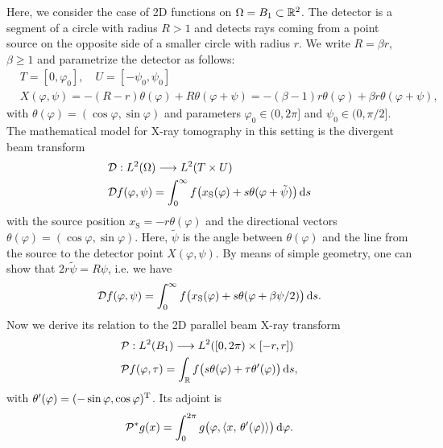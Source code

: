 \documentclass{amsart}
\renewcommand*{\phi}{\varphi}
\begin{document}
\begin{example}
 Here, we consider the case of 2D functions on $\Omega = B_1 \subset {\ensuremath{\mathbb{R}}}^2$. The detector is a segment of a circle with radius $R > 1$ and 
 detects rays coming from a point source on the opposite side of a smaller circle with radius $r$. We write $R = \beta r$, $\beta \geq 1$ 
 and parametrize the detector as follows:
 \begin{align*}
  & T = [0, \phi_0],\quad U = [-\psi_0, \psi_0] \\
  & X(\phi, \psi) = -(R - r) \theta(\phi) + R \theta(\phi + \psi) = -(\beta - 1) r \theta(\phi) + \beta r \theta(\phi + \psi),
 \end{align*}
 with $\theta(\phi) = (\cos\phi, \sin\phi)$ and parameters $\phi_0 \in (0, 2\pi]$ and $\psi_0 \in (0, \pi/2]$. The mathematical model 
 for X-ray tomography in this setting is the divergent beam transform
 \begin{align}
  &\OPD: L^2(\Omega) \Lto L^2(T \times U) \notag\\
  \label{eq:fanbeam_fwdproj_otherangle}
  &\OPD f(\phi, \psi) = \int_0^\infty f\big(x_{\mathrm{S}}(\phi) + s \theta(\phi + \tilde\psi)\big)\, \D s
 \end{align}
 with the source position $x_{\mathrm{S}} = -r \theta(\phi)$ and the directional vectors $\theta(\phi) = (\cos\phi, \sin\phi)$. Here, 
 $\tilde\psi$ is the angle between $\theta(\phi)$ and the line from the source to the detector point $X(\phi, \psi)$. By means of simple 
 geometry, one can show that $2r \tilde\psi = R\psi$, i.e. we have
 \begin{equation}
  \label{eq:fanbeam_fwdproj_realangle}
  \OPD f(\phi, \psi) = \int_0^\infty f\big(x_{\mathrm{S}}(\phi) + s \theta(\phi + \beta\psi/2)\big)\, \D s.
 \end{equation} 
 Now we derive its relation to the 2D parallel beam X-ray transform
 \begin{align}
  &\OPP: L^2(B_1) \Lto L^2([0,2\pi) \times [-r,r]) \notag \\
  \label{eq:fanbeam_xray_fwdproj}
  &\OPP f(\phi, \tau) = \int_\RR f\big(s\theta(\phi) + \tau \theta'(\phi)\big)\, \D s,
 \end{align} 
 with $\theta'(\phi) = \TRANSP{(-\sin\phi, \cos\phi)}$. Its adjoint is
 \begin{equation}
  \label{eq:fanbeam_xray_backproj}
  \DUALOPP g(x) = \int_0^{2\pi} g\big(\phi, \INNER{x}{\theta'(\phi)}\big)\, \D\phi.
 \end{equation} 

\end{example}
\end{document}
